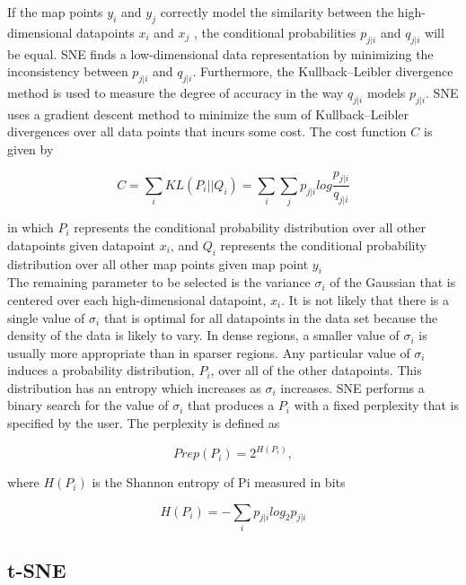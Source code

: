 \documentclass[12pt]{article}
\theoremstyle{plain}
\begin{document}
If the map points $y_i$ and $y_j$ correctly model the similarity between the high-dimensional datapoints $x_i$ and $x_j$ , the conditional probabilities $p_{j|i}$ and $q_{j|i}$ will be equal.
SNE finds a low-dimensional data representation by minimizing the inconsistency between $p_{j|i}$ and $q_{j|i}$. Furthermore, the Kullback–Leibler divergence method is used to measure the degree of accuracy in the way $q_{j|i}$ models $p_{j|i}$. SNE uses a gradient descent method to minimize the sum of Kullback–Leibler divergences over all data points that incurs some cost. The cost function $C$ is given by

\begin{equation}
C = \sum_i KL(P_i||Q_i)  = \sum_i\sum_j p_{j|i}log\frac{p_{j|i}}{q_{j|i}}
\end{equation}

in which $P_i$ represents the conditional probability distribution over all other datapoints given datapoint $x_i$, and $Q_i$ represents the conditional probability distribution over all other map points given map point $y_i$
\\

The remaining parameter to be selected is the variance $\sigma_i$ of the Gaussian that is centered over each high-dimensional datapoint, $x_i$. It is not likely that there is a single value of $\sigma_i$ that is optimal for all datapoints in the data set because the density of the data is likely to vary. In dense regions, a smaller value of $\sigma_i$ is usually more appropriate than in sparser regions. Any particular value of $\sigma_i$ induces a probability distribution, $P_i$, over all of the other datapoints. This distribution has an entropy which increases as $\sigma_i$ increases. SNE performs a binary search for the value of $\sigma_i$ that produces a $P_i$ with a fixed perplexity that is specified by the user. The perplexity is defined as

\begin{equation}
Prep(P_i)=2^{H(P_i)},
\end{equation}

where $H(P_i)$ is the Shannon entropy of Pi measured in bits

\begin{equation}
{H(P_i)}=-\sum_i p_{j|i}log_2 p_{j|i}
\end{equation}

\subsection{t-SNE}
\end{document}
